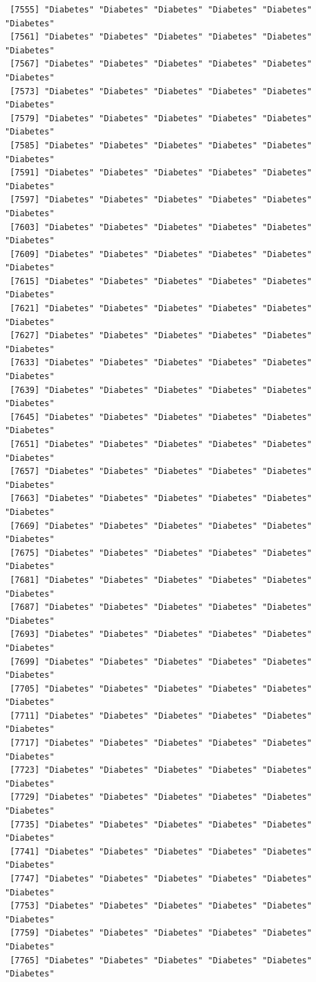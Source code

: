 \documentclass[
  letterpaper,
  DIV=11,
  numbers=noendperiod]{scrartcl}
\begin{document}
\begin{verbatim}
 [7555] "Diabetes" "Diabetes" "Diabetes" "Diabetes" "Diabetes" "Diabetes"
 [7561] "Diabetes" "Diabetes" "Diabetes" "Diabetes" "Diabetes" "Diabetes"
 [7567] "Diabetes" "Diabetes" "Diabetes" "Diabetes" "Diabetes" "Diabetes"
 [7573] "Diabetes" "Diabetes" "Diabetes" "Diabetes" "Diabetes" "Diabetes"
 [7579] "Diabetes" "Diabetes" "Diabetes" "Diabetes" "Diabetes" "Diabetes"
 [7585] "Diabetes" "Diabetes" "Diabetes" "Diabetes" "Diabetes" "Diabetes"
 [7591] "Diabetes" "Diabetes" "Diabetes" "Diabetes" "Diabetes" "Diabetes"
 [7597] "Diabetes" "Diabetes" "Diabetes" "Diabetes" "Diabetes" "Diabetes"
 [7603] "Diabetes" "Diabetes" "Diabetes" "Diabetes" "Diabetes" "Diabetes"
 [7609] "Diabetes" "Diabetes" "Diabetes" "Diabetes" "Diabetes" "Diabetes"
 [7615] "Diabetes" "Diabetes" "Diabetes" "Diabetes" "Diabetes" "Diabetes"
 [7621] "Diabetes" "Diabetes" "Diabetes" "Diabetes" "Diabetes" "Diabetes"
 [7627] "Diabetes" "Diabetes" "Diabetes" "Diabetes" "Diabetes" "Diabetes"
 [7633] "Diabetes" "Diabetes" "Diabetes" "Diabetes" "Diabetes" "Diabetes"
 [7639] "Diabetes" "Diabetes" "Diabetes" "Diabetes" "Diabetes" "Diabetes"
 [7645] "Diabetes" "Diabetes" "Diabetes" "Diabetes" "Diabetes" "Diabetes"
 [7651] "Diabetes" "Diabetes" "Diabetes" "Diabetes" "Diabetes" "Diabetes"
 [7657] "Diabetes" "Diabetes" "Diabetes" "Diabetes" "Diabetes" "Diabetes"
 [7663] "Diabetes" "Diabetes" "Diabetes" "Diabetes" "Diabetes" "Diabetes"
 [7669] "Diabetes" "Diabetes" "Diabetes" "Diabetes" "Diabetes" "Diabetes"
 [7675] "Diabetes" "Diabetes" "Diabetes" "Diabetes" "Diabetes" "Diabetes"
 [7681] "Diabetes" "Diabetes" "Diabetes" "Diabetes" "Diabetes" "Diabetes"
 [7687] "Diabetes" "Diabetes" "Diabetes" "Diabetes" "Diabetes" "Diabetes"
 [7693] "Diabetes" "Diabetes" "Diabetes" "Diabetes" "Diabetes" "Diabetes"
 [7699] "Diabetes" "Diabetes" "Diabetes" "Diabetes" "Diabetes" "Diabetes"
 [7705] "Diabetes" "Diabetes" "Diabetes" "Diabetes" "Diabetes" "Diabetes"
 [7711] "Diabetes" "Diabetes" "Diabetes" "Diabetes" "Diabetes" "Diabetes"
 [7717] "Diabetes" "Diabetes" "Diabetes" "Diabetes" "Diabetes" "Diabetes"
 [7723] "Diabetes" "Diabetes" "Diabetes" "Diabetes" "Diabetes" "Diabetes"
 [7729] "Diabetes" "Diabetes" "Diabetes" "Diabetes" "Diabetes" "Diabetes"
 [7735] "Diabetes" "Diabetes" "Diabetes" "Diabetes" "Diabetes" "Diabetes"
 [7741] "Diabetes" "Diabetes" "Diabetes" "Diabetes" "Diabetes" "Diabetes"
 [7747] "Diabetes" "Diabetes" "Diabetes" "Diabetes" "Diabetes" "Diabetes"
 [7753] "Diabetes" "Diabetes" "Diabetes" "Diabetes" "Diabetes" "Diabetes"
 [7759] "Diabetes" "Diabetes" "Diabetes" "Diabetes" "Diabetes" "Diabetes"
 [7765] "Diabetes" "Diabetes" "Diabetes" "Diabetes" "Diabetes" "Diabetes"

\end{verbatim}
\end{document}
